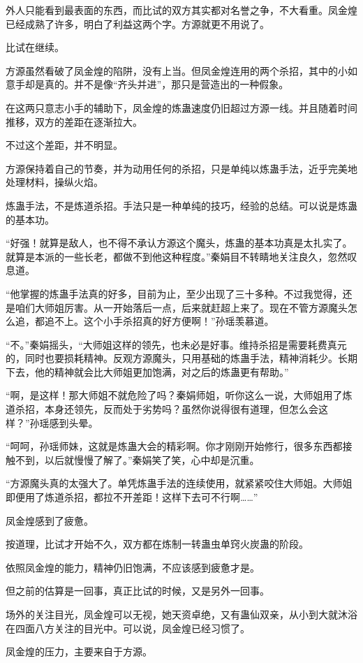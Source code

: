 \begin{this_body}
外人只能看到最表面的东西，而比试的双方其实都对名誉之争，不大看重。凤金煌已经成熟了许多，明白了利益这两个字。方源就更不用说了。

比试在继续。

方源虽然看破了凤金煌的陷阱，没有上当。但凤金煌连用的两个杀招，其中的小如意手却是真的。并不是像“齐头并进”，那只是营造出的一种假象。

在这两只意志小手的辅助下，凤金煌的炼蛊速度仍旧超过方源一线。并且随着时间推移，双方的差距在逐渐拉大。

不过这个差距，并不明显。

方源保持着自己的节奏，并为动用任何的杀招，只是单纯以炼蛊手法，近乎完美地处理材料，操纵火焰。

炼蛊手法，不是炼道杀招。手法只是一种单纯的技巧，经验的总结。可以说是炼蛊的基本功。

“好强！就算是敌人，也不得不承认方源这个魔头，炼蛊的基本功真是太扎实了。就算是本派的一些长老，都做不到他这种程度。”秦娟目不转睛地关注良久，忽然叹息道。

“他掌握的炼蛊手法真的好多，目前为止，至少出现了三十多种。不过我觉得，还是咱们大师姐厉害。从一开始落后一点，后来就赶超上来了。现在不管方源魔头怎么追，都追不上。这个小手杀招真的好方便啊！”孙瑶羡慕道。

“不。”秦娟摇头，“大师姐这样的领先，也未必是好事。维持杀招是需要耗费真元的，同时也要损耗精神。反观方源魔头，只用基础的炼蛊手法，精神消耗少。长期下去，他的精神就会比大师姐更加饱满，对之后的炼蛊更有帮助。”

“啊，是这样！那大师姐不就危险了吗？秦娟师姐，听你这么一说，大师姐用了炼道杀招，本身还领先，反而处于劣势吗？虽然你说得很有道理，但怎么会这样？”孙瑶感到头晕。

“呵呵，孙瑶师妹，这就是炼蛊大会的精彩啊。你才刚刚开始修行，很多东西都接触不到，以后就慢慢了解了。”秦娟笑了笑，心中却是沉重。

“方源魔头真的太强大了。单凭炼蛊手法的连续使用，就紧紧咬住大师姐。大师姐即便用了炼道杀招，都拉不开差距！这样下去可不行啊……”

凤金煌感到了疲惫。

按道理，比试才开始不久，双方都在炼制一转蛊虫单窍火炭蛊的阶段。

依照凤金煌的能力，精神仍旧饱满，不应该感到疲惫才是。

但之前的估算是一回事，真正比试的时候，又是另外一回事。

场外的关注目光，凤金煌可以无视，她天资卓绝，又有蛊仙双亲，从小到大就沐浴在四面八方关注的目光中。可以说，凤金煌已经习惯了。

凤金煌的压力，主要来自于方源。


\end{this_body}
